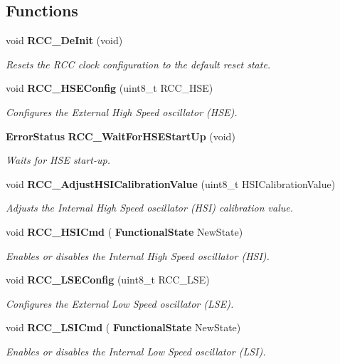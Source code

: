 \subsection*{Functions}
\begin{DoxyCompactItemize}
\item 
void \textbf{ R\+C\+C\+\_\+\+De\+Init} (void)
\begin{DoxyCompactList}\small\item\em Resets the R\+CC clock configuration to the default reset state. \end{DoxyCompactList}\item 
void \textbf{ R\+C\+C\+\_\+\+H\+S\+E\+Config} (uint8\+\_\+t R\+C\+C\+\_\+\+H\+SE)
\begin{DoxyCompactList}\small\item\em Configures the External High Speed oscillator (H\+SE). \end{DoxyCompactList}\item 
\textbf{ Error\+Status} \textbf{ R\+C\+C\+\_\+\+Wait\+For\+H\+S\+E\+Start\+Up} (void)
\begin{DoxyCompactList}\small\item\em Waits for H\+SE start-\/up. \end{DoxyCompactList}\item 
void \textbf{ R\+C\+C\+\_\+\+Adjust\+H\+S\+I\+Calibration\+Value} (uint8\+\_\+t H\+S\+I\+Calibration\+Value)
\begin{DoxyCompactList}\small\item\em Adjusts the Internal High Speed oscillator (H\+SI) calibration value. \end{DoxyCompactList}\item 
void \textbf{ R\+C\+C\+\_\+\+H\+S\+I\+Cmd} (\textbf{ Functional\+State} New\+State)
\begin{DoxyCompactList}\small\item\em Enables or disables the Internal High Speed oscillator (H\+SI). \end{DoxyCompactList}\item 
void \textbf{ R\+C\+C\+\_\+\+L\+S\+E\+Config} (uint8\+\_\+t R\+C\+C\+\_\+\+L\+SE)
\begin{DoxyCompactList}\small\item\em Configures the External Low Speed oscillator (L\+SE). \end{DoxyCompactList}\item 
void \textbf{ R\+C\+C\+\_\+\+L\+S\+I\+Cmd} (\textbf{ Functional\+State} New\+State)
\begin{DoxyCompactList}\small\item\em Enables or disables the Internal Low Speed oscillator (L\+SI). \end{DoxyCompactList}\item 

\end{DoxyCompactItemize}

